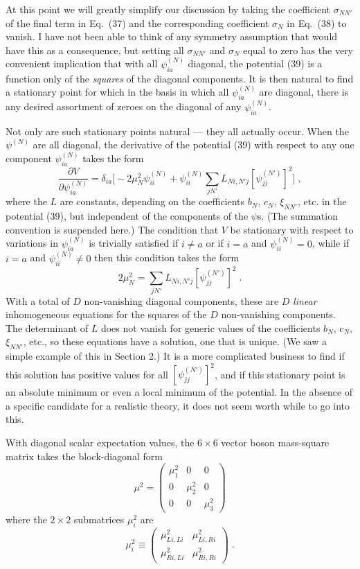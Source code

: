 At this  point we will greatly simplify  our discussion by taking the coefficient $\sigma_{NN'}$ of the final term in Eq.~(37) and the corresponding coefficient $\sigma_N$ in Eq.~(38) to vanish.  I have not been able to think of any symmetry assumption that would have this as a consequence, but setting all $\sigma_{NN'}$ and $\sigma_N$ equal to zero has the very convenient implication that with all $\psi^{(N)}_{ia}$  diagonal, the potential (39) is a function only of the {\em squares} of the diagonal components.  It is then natural to find a stationary point for which  in the basis in which all $\psi^{(N)}_{ia}$  are diagonal, there is  any desired assortment of zeroes on the diagonal of any $\psi^{(N)}_{ia}$.

Not only are such stationary points natural --- they all actually occur.  When the $\psi^{(N)}$ are all diagonal, the derivative of the potential (39) with respect to any one  component $\psi^{(N)}_{ia}$ takes the form
$$\frac{\partial V}{\partial \psi^{(N)}_{ia}}=\delta_{ia}\Big[-2\mu_N^2\psi^{(N)}_{ii}+\psi^{(N)}_{ii}\sum_{jN'}L_{Ni,N'j}[\psi^{(N')}_{jj}]^2\Big]\;,$$
where the $L$ are constants, depending on the coefficients $b_N$, $c_N$, $\xi_{NN'}$, etc. in the potential (39), but independent of the components of the $\psi$s.
(The summation convention is suspended here.)  The condition that $V$ be stationary with respect to variations in  $\psi^{(N)}_{ia}$ is trivially satisfied if $i\neq a$ or if $i=a$ and $\psi^{(N)}_{ii}=0$, while if $i=a$ and 
$\psi^{(N)}_{ii}\neq 0$ then this condition takes the form
$$2\mu_N^2=\sum_{jN'}L_{Ni,N'j}[\psi^{(N')}_{jj}]^2\;.$$
With a total of $D$ non-vanishing diagonal components, these are $D$ {\em linear} inhomogeneous equations for the squares of the $D$ non-vanishing components.  The determinant of $L$ does not vanish for generic values of the coefficients $b_N$, $c_N$, $\xi_{NN'}$, etc., so these equations have a solution, one that is unique. (We saw a simple example of this in Section 2.)  It is a more complicated business to find if this solution has positive values for all $[\psi^{(N')}_{jj}]^2$, and if this stationary point is an absolute minimum or even a local minimum of the potential.  In the absence of a specific candidate for a realistic theory, it does not seem worth while to go into this.



With diagonal  scalar expectation values, the $6\times 6$ vector boson mass-square matrix takes the block-diagonal form
\begin{equation}
\mu^2=\left(\begin{array}{ccc}\mu_1^2 & 0 & 0 \\0 & \mu_2^2 & 0 \\ 0 & 0 & \mu_3^2 \end{array}\right)
\end{equation}
where the $2\times 2$ submatrices $\mu_i^2$ are
\begin{equation}
\mu_i^2\equiv \left(\begin{array}{cc} \mu^2_{Li,Li} & \mu^2_{Li,Ri} \\ \mu^2_{Ri,Li} & \mu^2_{Ri,Ri}\end{array}\right)\;.
\end{equation}


